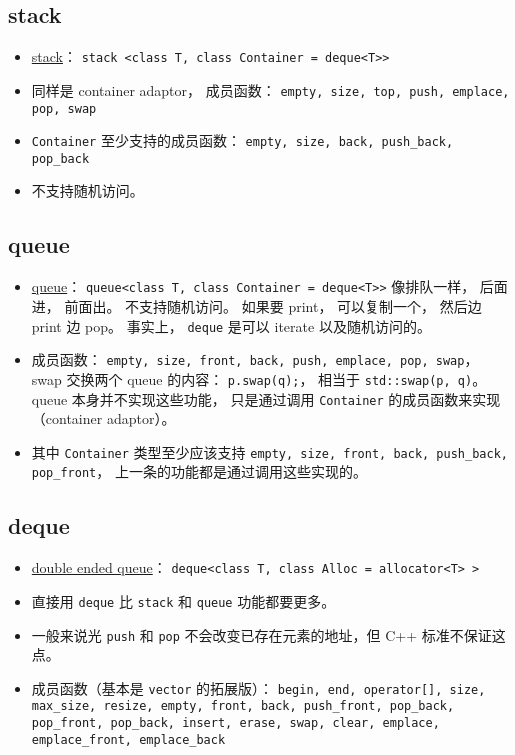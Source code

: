 \subsection{stack}
\begin{itemize}
\item \href{https://cplusplus.com/reference/stack/stack/}{stack}： \verb|stack <class T, class Container = deque<T>>|
\item 同样是 container adaptor， 成员函数： \verb|empty, size, top, push, emplace, pop, swap|
\item \verb|Container| 至少支持的成员函数： \verb|empty, size, back, push_back, pop_back|
\item 不支持随机访问。
\end{itemize}

\subsection{queue}
\begin{itemize}
\item \href{https://cplusplus.com/reference/queue/queue/}{queue}： \verb|queue<class T, class Container = deque<T>>| 像排队一样， 后面进， 前面出。 不支持随机访问。 如果要 print， 可以复制一个， 然后边 print 边 pop。 事实上， \verb|deque| 是可以 iterate 以及随机访问的。
\item 成员函数： \verb|empty, size, front, back, push, emplace, pop, swap|， swap 交换两个 queue 的内容： \verb|p.swap(q);|， 相当于 \verb|std::swap(p, q)|。 queue 本身并不实现这些功能， 只是通过调用 \verb|Container| 的成员函数来实现（container adaptor）。
\item 其中 \verb|Container| 类型至少应该支持 \verb|empty, size, front, back, push_back, pop_front|， 上一条的功能都是通过调用这些实现的。
\end{itemize}

\subsection{deque}
\begin{itemize}
\item \href{https://cplusplus.com/reference/deque/deque/}{double ended queue}： \verb|deque<class T, class Alloc = allocator<T> >|
\item 直接用 \verb|deque| 比 \verb|stack| 和 \verb|queue| 功能都要更多。
\item 一般来说光 \verb`push` 和 \verb`pop` 不会改变已存在元素的地址，但 C++ 标准不保证这点。
\item 成员函数（基本是 \verb|vector| 的拓展版）： \verb|begin, end, operator[], size, max_size, resize, empty, front, back, push_front, pop_back, pop_front, pop_back, insert, erase, swap, clear, emplace, emplace_front, emplace_back|
\end{itemize}

